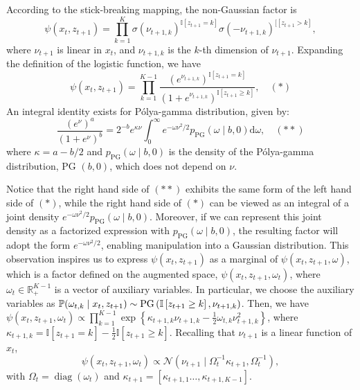 According to the stick-breaking mapping, the non-Gaussian factor is
$$\psi\left(x_{t}, z_{t+1}\right)=\prod_{k=1}^{K} \sigma\left(\nu_{t+1, k}\right)^{\mathbb{I}\left[z_{t+1}=k\right]} \sigma\left(-\nu_{t+1, k}\right)^{\mathbb{[}\left[z_{t+1}>k\right]},$$ where  $\nu_{t+1}$ is linear in $x_{t}$, and $\nu_{t+1, k}$ is the $k$-th dimension of $\nu_{t+1}$.  Expanding the definition of the logistic function, we have
$$
\psi\left(x_{t}, z_{t+1}\right)=\prod_{k=1}^{K-1} \frac{\left(e^{\nu_{t+1, k}}\right)^{\mathbb{I}\left[z_{t+1}=k\right]}}{\left(1+e^{\nu_{t+1, k}}\right)^{\mathbb{I}\left[z_{t+1} \geq k\right]}}, \quad (*)
$$
An integral identity exists for Pólya-gamma distribution, given by:
$$
\frac{\left(e^{\nu}\right)^{a}}{\left(1+e^{\nu}\right)^{b}}=2^{-b} e^{\kappa \nu} \int_{0}^{\infty} e^{-\omega \nu^{2} / 2} p_{\mathrm{PG}}(\omega \mid b, 0) \mathrm{d} \omega, \quad(**)
$$
where $\kappa=a-b / 2$ and $p_{\mathrm{PG}}(\omega \mid b, 0)$ is the density of the Pólya-gamma distribution, PG $(b, 0)$, which does not depend on $\nu$.   

Notice that the right hand side of $(**)$ exhibits the same form of the left hand side of $(*)$, while the right hand side of $(*)$ can be viewed as an integral of a joint density $e^{-\omega \nu^{2} / 2} p_{\mathrm{PG}}(\omega \mid b, 0)$. Moreover, if we can represent this joint density as a factorized expression with $p_{\mathrm{PG}}(\omega \mid b, 0)$, the resulting factor will adopt the form $e^{-\omega \nu^{2} / 2}$, enabling manipulation into a Gaussian distribution. This observation inspires us to 
express  $\psi\left(x_{t}, z_{t+1}\right)$ as a marginal of $\psi\left(x_{t}, z_{t+1}, \omega \right)$, which is a factor defined on the augmented space, $\psi\left(x_{t}, z_{t+1}, \omega_{t}\right)$, where $\omega_{t} \in \mathbb{R}_{+}^{K-1}$ is a vector of auxiliary variables. In particular, we choose the auxiliary variables as $\mathbb{P}(\omega_{t, k} \mid x_{t}, z_{t+1}) \sim \mathrm{PG}\left(\mathbb{I}\left[z_{t+1} \geq k\right], \nu_{t+1, k}\right)$. Then,  we have $\psi\left(x_{t}, z_{t+1}, \omega_{t}\right) \propto \prod_{k=1}^{K-1} \exp \left\{\kappa_{t+1, k} \nu_{t+1, k}-\frac{1}{2} \omega_{t, k} \nu_{t+1, k}^{2}\right\}$, where $\kappa_{t+1, k}=\mathbb{I}\left[z_{t+1}=k\right]-\frac{1}{2} \mathbb{I}\left[z_{t+1} \geq k\right]$. Recalling that $\nu_{t+1}$ is a linear function of $x_{t}$, 
$$
\psi\left(x_{t}, z_{t+1}, \omega_{t}\right) \propto \mathcal{N}\left(\nu_{t+1} \mid \Omega_{t}^{-1} \kappa_{t+1}, \Omega_{t}^{-1}\right),
$$
with $\Omega_{t}=\operatorname{diag}\left(\omega_{t}\right)$ and $\kappa_{t+1}=\left[\kappa_{t+1,1} \ldots, \kappa_{t+1, K-1}\right]$. 

